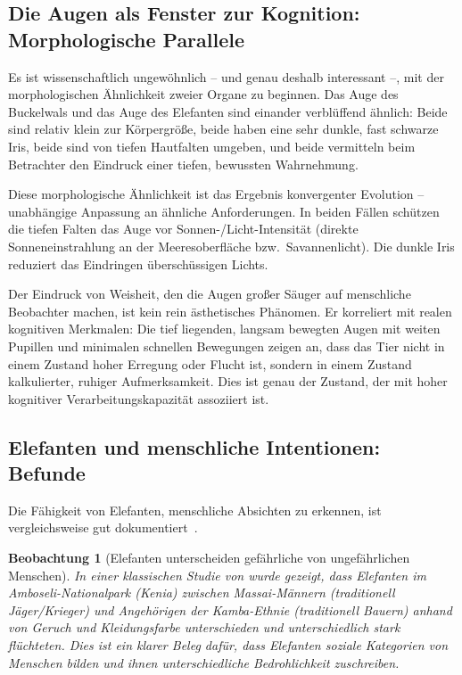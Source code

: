 ﻿\documentclass[12pt,a4paper]{article}
\newtheorem{beobachtung}{Beobachtung}[section]
\theoremstyle{definition}
\theoremstyle{remark}
\begin{document}
\subsection{Die Augen als Fenster zur Kognition: Morphologische Parallele}

Es ist wissenschaftlich ungewöhnlich -- und genau deshalb interessant --, mit
der morphologischen Ähnlichkeit zweier Organe zu beginnen. Das Auge des
Buckelwals und das Auge des Elefanten sind einander verblüffend ähnlich:
Beide sind relativ klein zur Körpergröße, beide haben eine sehr dunkle,
fast schwarze Iris, beide sind von tiefen Hautfalten umgeben, und beide
vermitteln beim Betrachter den Eindruck einer tiefen, bewussten Wahrnehmung.

Diese morphologische Ähnlichkeit ist das Ergebnis konvergenter Evolution --
unabhängige Anpassung an ähnliche Anforderungen. In beiden Fällen schützen
die tiefen Falten das Auge vor Sonnen-/Licht-Intensität (direkte Sonneneinstrahlung
an der Meeresoberfläche bzw.\ Savannenlicht). Die dunkle Iris reduziert das
Eindringen überschüssigen Lichts.

Der Eindruck von Weisheit, den die Augen großer Säuger auf menschliche
Beobachter machen, ist kein rein ästhetisches Phänomen. Er korreliert
mit realen kognitiven Merkmalen: Die tief liegenden, langsam bewegten Augen
mit weiten Pupillen und minimalen schnellen Bewegungen zeigen an, dass das
Tier nicht in einem Zustand hoher Erregung oder Flucht ist, sondern in einem
Zustand kalkulierter, ruhiger Aufmerksamkeit. Dies ist genau der Zustand,
der mit hoher kognitiver Verarbeitungskapazität assoziiert ist.

\subsection{Elefanten und menschliche Intentionen: Befunde}

Die Fähigkeit von Elefanten, menschliche Absichten zu erkennen, ist
vergleichsweise gut dokumentiert~\cite{mccomb2014elephants, bates2007elephants}.

\begin{beobachtung}[Elefanten unterscheiden gefährliche von ungefährlichen Menschen]
  In einer klassischen Studie von \cite{bates2007elephants} wurde gezeigt, dass
  Elefanten im Amboseli-Nationalpark (Kenia) zwischen Massai-Männern (traditionell
  Jäger/Krieger) und Angehörigen der Kamba-Ethnie (traditionell Bauern)
  anhand von Geruch und Kleidungsfarbe unterschieden und unterschiedlich
  stark flüchteten. Dies ist ein klarer Beleg dafür, dass Elefanten
  soziale Kategorien von Menschen bilden und ihnen unterschiedliche
  Bedrohlichkeit zuschreiben.
\end{beobachtung}
\end{document}
